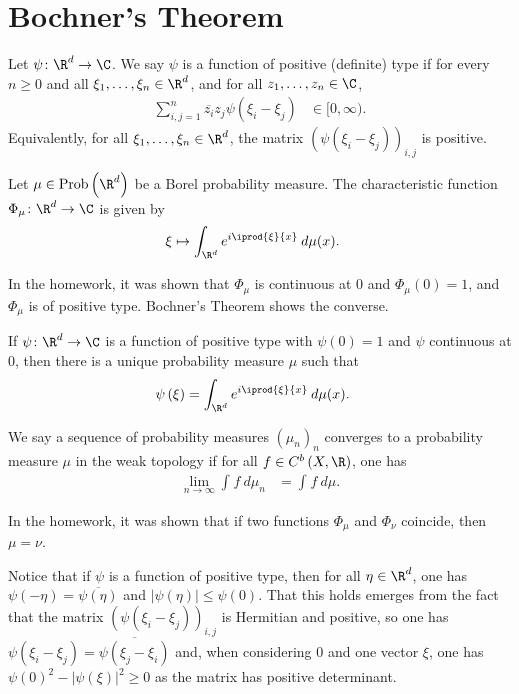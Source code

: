 \documentclass[10pt]{mypackage}
\begin{document}
\section{Bochner's Theorem}%
\begin{definition}
  Let $\psi\colon \R^d\to \C$. We say $\psi$ is a function of positive (definite) type if for every $n\geq 0$ and all $\xi_1,\dots,\xi_n\in \R^d$, and for all $z_1,\dots,z_n\in \C$,
  \begin{align*}
    \sum_{i,j=1}^{n} \overline{z_i} z_j \psi\left( \xi_i-\xi_j \right) &\in [0,\infty).
  \end{align*}
  Equivalently, for all $\xi_1,\dots,\xi_n\in \R^d$, the matrix $\left( \psi\left( \xi_i-\xi_j \right) \right)_{i,j}$ is positive.
\end{definition}
\begin{definition}
  Let $\mu\in \operatorname{Prob}\left( \R^d \right)$ be a Borel probability measure. The characteristic function $\Phi_{\mu}\colon \R^d\to \C$ is given by
  \begin{align*}
    \xi &\mapsto \int_{\R^d}^{} e^{i \iprod{\xi}{x}}\:d\mu(x).
  \end{align*}
\end{definition}
In the homework, it was shown that $\Phi_{\mu}$ is continuous at $0$ and $\Phi_{\mu}(0)= 1$, and $\Phi_{\mu}$ is of positive type. Bochner's Theorem shows the converse.
\begin{theorem}
  If $\psi\colon \R^d\to \C$ is a function of positive type with $\psi(0) = 1$ and $\psi$ continuous at $0$, then there is a unique probability measure $\mu$ such that
  \begin{align*}
    \psi\left(\xi\right) &= \int_{\R^d}^{} e^{i \iprod{\xi}{x}}\:d\mu(x).
  \end{align*}
\end{theorem}
\begin{definition}
  We say a sequence of probability measures $\left( \mu_n \right)_n$ converges to a probability measure $\mu$ in the weak topology if for all $f\in C^b\left( X,\R \right)$, one has
  \begin{align*}
    \lim_{n\to\infty} \int_{}^{} f\:d\mu_n &= \int_{}^{} f\:d\mu.
  \end{align*}
\end{definition}
In the homework, it was shown that if two functions $\Phi_{\mu}$ and $\Phi_{\nu}$ coincide, then $\mu = \nu$.

Notice that if $\psi$ is a function of positive type, then for all $\eta\in \R^d$, one has $\psi\left( -\eta \right) = \overline{\psi(\eta)}$ and $\left\vert \psi\left( \eta \right) \right\vert\leq \psi(0)$. That this holds emerges from the fact that the matrix $\left( \psi\left( \xi_i-\xi_j \right) \right)_{i,j}$ is Hermitian and positive, so one has $\psi\left( \xi_i-\xi_j \right) = \overline{\psi\left( \xi_j-\xi_i \right)}$ and, when considering $0$ and one vector $\xi$, one has $\psi(0)^2-\left\vert \psi\left( \xi \right) \right\vert^2 \geq 0$ as the matrix has positive determinant.
\end{document}
